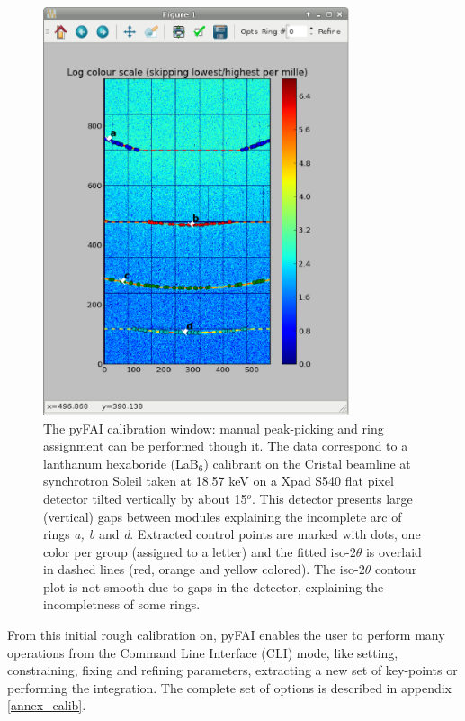 \documentclass{iucr}
\begin{document}
\begin{figure}
\label{calib}
\begin{center}
\includegraphics[width=9cm]{calib_xpad.eps}
\caption{The pyFAI calibration window: manual peak-picking and
ring assignment can be performed though it.
The data correspond to a lanthanum hexaboride (LaB$_6$) calibrant on the Cristal
beamline at synchrotron Soleil taken at 18.57 keV on a Xpad S540 flat pixel
detector tilted vertically by about 15$^o$.
This detector presents large (vertical) gaps between modules explaining the
incomplete arc of rings \textit{a, b} and \textit{d}.
Extracted control points are marked with dots, one color per group (assigned to
a letter) and the fitted iso-$2\theta$ is overlaid in dashed lines
(red, orange and yellow colored).
The iso-$2\theta$ contour plot is not smooth due to gaps in the
detector, explaining the incompletness of some rings.}
\end{center}
\end{figure}

From this initial rough calibration on, pyFAI enables  the user to perform
many operations from the Command Line Interface (CLI) mode, like setting,
constraining, fixing and  refining parameters, extracting a new set of
key-points or performing the integration.
The complete set of options is described in appendix \ref{annex_calib}.
\end{document}
